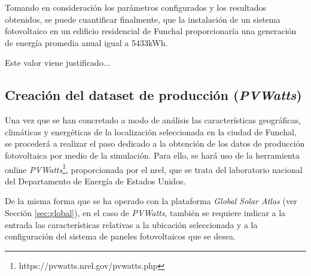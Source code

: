 Tomando en consideración los parámetros configurados y los resultados obtenidos, se puede cuantificar finalmente, que la instalación de un sistema fotovoltaico en un edificio residencial de Funchal proporcionaría una generación de energía promedia anual igual a 5433kWh.

\vspace{3mm}

Este valor viene justificado...











\subsection{Creación del dataset de producción (\textit{PVWatts})}
\label{sec:pvw}

Una vez que se han concretado a modo de análisis las características geográficas, climáticas y energéticas de la localización seleccionada en la ciudad de Funchal, se procederá a realizar el paso dedicado a la obtención de los datos de producción fotovoltaica por medio de la simulación. Para ello, se hará uso de la herramienta online \textit{PVWatts}\footnote{https://pvwatts.nrel.gov/pvwatts.php}, proporcionada por el \gls{nrel}, que se trata del laboratorio nacional del Departamento de Energía de Estados Unidos. \cite{pvwatts}

\vspace{3mm}

De la misma forma que se ha operado con la plataforma \textit{Global Solar Atlas} (ver Sección \ref{sec:global}), en el caso de \textit{PVWatts}, también se requiere indicar a la entrada las características relativas a la ubicación seleccionada y a la configuración del sistema de paneles fotovoltaicos que se desea. 

